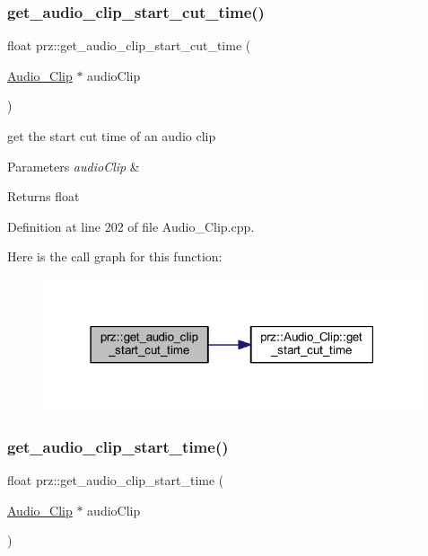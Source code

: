 \subsubsection{\texorpdfstring{get\_audio\_clip\_start\_cut\_time()}{get\_audio\_clip\_start\_cut\_time()}}
{\footnotesize\ttfamily float prz\+::get\+\_\+audio\+\_\+clip\+\_\+start\+\_\+cut\+\_\+time (\begin{DoxyParamCaption}\item[{\mbox{\hyperlink{classprz_1_1_audio___clip}{Audio\+\_\+\+Clip}} $\ast$}]{audio\+Clip }\end{DoxyParamCaption})}



get the start cut time of an audio clip 


\begin{DoxyParams}{Parameters}
{\em audio\+Clip} & \\
\hline
\end{DoxyParams}
\begin{DoxyReturn}{Returns}
float 
\end{DoxyReturn}


Definition at line 202 of file Audio\+\_\+\+Clip.\+cpp.

Here is the call graph for this function\+:
\nopagebreak
\begin{figure}[H]
\begin{center}
\leavevmode
\includegraphics[width=316pt]{namespaceprz_a80b9123c3664ba7b0e6bcceed4362dfc_cgraph}
\end{center}
\end{figure}
\mbox{\label{namespaceprz_ae887fdd042262bc94a29ad81d9737093}} 
\subsubsection{\texorpdfstring{get\_audio\_clip\_start\_time()}{get\_audio\_clip\_start\_time()}}
{\footnotesize\ttfamily float prz\+::get\+\_\+audio\+\_\+clip\+\_\+start\+\_\+time (\begin{DoxyParamCaption}\item[{\mbox{\hyperlink{classprz_1_1_audio___clip}{Audio\+\_\+\+Clip}} $\ast$}]{audio\+Clip }\end{DoxyParamCaption})}



